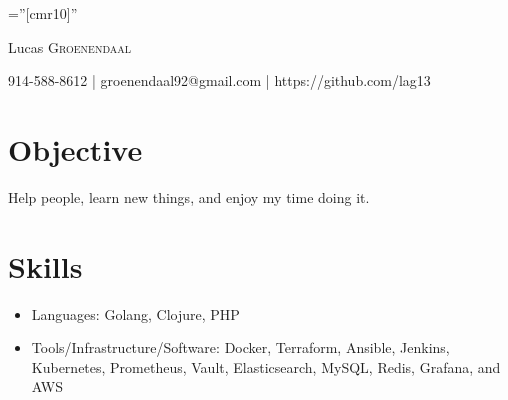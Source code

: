 \documentclass[a4paper,10pt]{article}
\begin{document}

\pagestyle{empty} %

\font\fb=''[cmr10]'' %

\par{\centering
		{\Huge Lucas \textsc{Groenendaal}
  }\par}

\par{\centering
  {\normalsize
  914-588-8612 | groenendaal92@gmail.com | https://github.com/lag13
}\par}
\bigskip

\section{Objective}
Help people, learn new things, and enjoy my time doing it.

\section{Skills}
\begin{itemize}
  \item Languages: Golang, Clojure, PHP
  \item Tools/Infrastructure/Software: Docker, Terraform, Ansible, Jenkins, Kubernetes, Prometheus, Vault, Elasticsearch, MySQL, Redis, Grafana, and AWS
\end{itemize}
\end{document}
